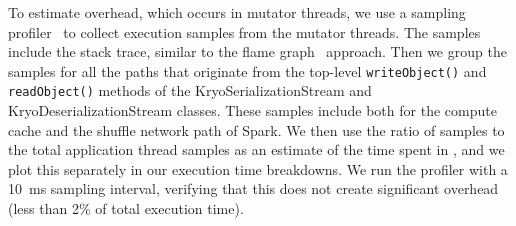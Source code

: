 To estimate \teraheapSD overhead, which occurs in mutator threads, we use a
sampling profiler~\cite{async-profiler} to collect execution samples
from the mutator threads. The samples include the stack trace, similar
to the flame graph~\cite{flamegraphs} approach. Then we group the
samples for all the paths that originate from the top-level
\texttt{writeObject()} and \texttt{readObject()} methods of the
KryoSerializationStream and KryoDeserializationStream classes. These
samples include both \teraheapSD for the compute cache and the shuffle
network path of Spark. We then use the ratio of \teraheapSD samples to the
total application thread samples as an estimate of the time spent in
\teraheapSD, and we plot this separately in our execution time breakdowns. We
run the profiler with a \SI{10}{ms} sampling interval, verifying that
this does not create significant overhead (less than 2\% of total
execution time).
